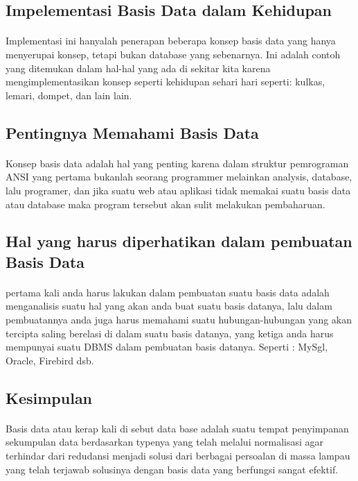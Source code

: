 \documentclass[a4papper,12pt]{article}
\begin{document}
\subsection{Impelementasi Basis Data dalam Kehidupan}
	\paragraph{}Implementasi ini hanyalah penerapan beberapa konsep basis data yang hanya menyerupai konsep, tetapi bukan database yang sebenarnya. Ini adalah contoh yang ditemukan dalam hal-hal yang ada di sekitar kita karena mengimplementasikan konsep seperti kehidupan sehari hari seperti: kulkas, lemari, dompet, dan lain lain.
\subsection{Pentingnya Memahami Basis Data}
	\paragraph{}Konsep basis data adalah hal yang penting karena dalam struktur pemrograman ANSI yang pertama bukanlah seorang programmer melainkan analysis, database, lalu programer, dan jika suatu web atau aplikasi tidak memakai suatu basis data atau database maka program tersebut akan sulit melakukan pembaharuan.
\newpage
\subsection{Hal yang harus diperhatikan dalam pembuatan Basis Data}
	\paragraph{}pertama kali anda harus lakukan dalam pembuatan suatu basis data adalah menganalisis suatu hal yang akan anda buat suatu basis datanya, lalu dalam pembuatannya anda juga harus memahami suatu hubungan-hubungan yang akan tercipta saling berelasi di dalam suatu basis datanya, yang ketiga anda harus mempunyai suatu DBMS dalam pembuatan basis datanya. Seperti : MySgl, Oracle, Firebird dsb.
\subsection{Kesimpulan}
	\paragraph{}Basis data atau kerap kali di sebut data base adalah suatu tempat penyimpanan sekumpulan data berdasarkan typenya yang telah melalui normalisasi agar terhindar dari redudansi menjadi solusi dari berbagai persoalan di massa lampau yang telah terjawab solusinya dengan basis data yang berfungsi sangat efektif.
\end{document}
